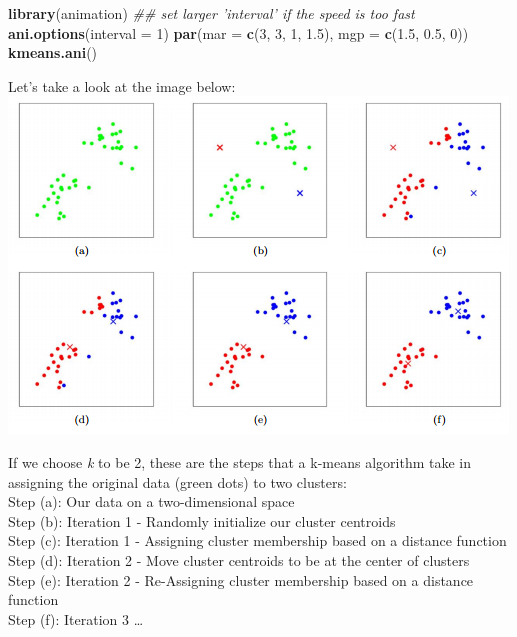 \documentclass[]{article}
\newenvironment{Shaded}{\begin{snugshade}}{\end{snugshade}}
\newcommand{\CommentTok}[1]{\textcolor[rgb]{0.56,0.35,0.01}{\textit{#1}}}
\newcommand{\DataTypeTok}[1]{\textcolor[rgb]{0.13,0.29,0.53}{#1}}
\newcommand{\DecValTok}[1]{\textcolor[rgb]{0.00,0.00,0.81}{#1}}
\newcommand{\FloatTok}[1]{\textcolor[rgb]{0.00,0.00,0.81}{#1}}
\newcommand{\KeywordTok}[1]{\textcolor[rgb]{0.13,0.29,0.53}{\textbf{#1}}}
\newcommand{\NormalTok}[1]{#1}
\begin{document}
\begin{Shaded}
\begin{Highlighting}[]
\KeywordTok{library}\NormalTok{(animation)}
\CommentTok{## set larger 'interval' if the speed is too fast}
\KeywordTok{ani.options}\NormalTok{(}\DataTypeTok{interval =} \DecValTok{1}\NormalTok{)}
\KeywordTok{par}\NormalTok{(}\DataTypeTok{mar =} \KeywordTok{c}\NormalTok{(}\DecValTok{3}\NormalTok{, }\DecValTok{3}\NormalTok{, }\DecValTok{1}\NormalTok{, }\FloatTok{1.5}\NormalTok{), }\DataTypeTok{mgp =} \KeywordTok{c}\NormalTok{(}\FloatTok{1.5}\NormalTok{, }\FloatTok{0.5}\NormalTok{, }\DecValTok{0}\NormalTok{))}
\KeywordTok{kmeans.ani}\NormalTok{()}
\end{Highlighting}
\end{Shaded}

Let's take a look at the image below:
\includegraphics{assets/centroids.png}

If we choose \emph{k} to be 2, these are the steps that a k-means
algorithm take in assigning the original data (green dots) to two
clusters:\\
Step (a): Our data on a two-dimensional space\\
Step (b): Iteration 1 - Randomly initialize our cluster centroids\\
Step (c): Iteration 1 - Assigning cluster membership based on a distance
function\\
Step (d): Iteration 2 - Move cluster centroids to be at the center of
clusters\\
Step (e): Iteration 2 - Re-Assigning cluster membership based on a
distance function\\
Step (f): Iteration 3 \ldots{}
\end{document}
